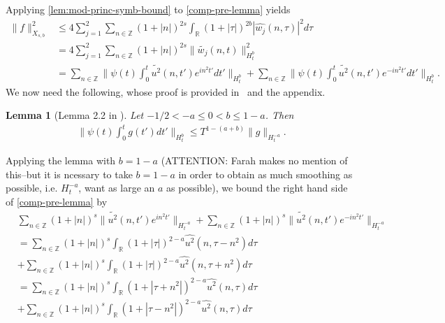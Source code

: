 \documentclass[12pt,reqno]{amsart}
\numberwithin{equation}{section}  %
\numberwithin{figure}{section}
\newcommand{\rr}{\mathbb{R}}
\newcommand{\zz}{\mathbb{Z}}
\newcommand{\wh}{\widehat}
\newcommand{\wt}{\widetilde}
\theoremstyle{plain}
\newtheorem{lemma}{Lemma}
\theoremstyle{definition}
\theoremstyle{remark}
\begin{document}
%
%
Applying \autoref{lem:mod-princ-symb-bound} to \eqref{comp-pre-lemma} yields
%
%
\begin{equation*}
\begin{split}
\| f \|_{X_{s,b}}^{2}
  & \le 4 \sum_{j=1}^{2}  \sum_{n \in \zz} (1 + |n|)^{2s} \int_{\rr} (1 + |
  \tau|)^{2b} | \wh{w_{j}}(n, \tau)|^2 d \tau
  \\
  & = 4 \sum_{j=1}^{2} \sum_{n \in \zz} (1 + |n|)^{2s} \|\wt{w_{j}}(n, t)
  \|^{2}_{H_{t}^{b}}
  \\
  & = \sum_{n \in \zz} \| \psi(t) \int_{0}^{t} \wt{u^2}(n, t')
  e^{in^{2}t'}dt'  \|_{H_{t}^{b}}
  + 
  \sum_{n \in \zz} \| \psi(t) \int_{0}^{t} \wt{u^2}(n, t')
  e^{-in^{2}t'}dt'  \|_{H_{t}^{b}}.
\end{split}
\end{equation*}
%
We now need the following, whose proof is provided in~\cite{Ginibre:1996fk} and
the appendix.
%
%
%
%
%
%
%
%
\begin{lemma}[Lemma 2.2 in \cite{Farah:2009uq}]
Let $-1/2 < -a \le 0 < b \le 1-a$. Then
%
%
\begin{equation*}
\begin{split}
  \| \psi(t) \int_{0}^{t} g(t') dt' \|_{H^{b}_{t}} \le T^{1-(a+b)} \| g
  \|_{H_{t}^{-a}}.
\end{split}
\end{equation*}
%
%
\label{lem:pre-bilin-est}
\end{lemma}
%
%
Applying the lemma with $b = 1 - a$ (ATTENTION: Farah makes no mention of this--but it is
ncessary to take $b = 1-a$ in order to obtain as much smoothing as possible,
i.e. $H_t^{-a}$, want as large an $a$ as possible), we bound the right hand side of \eqref{comp-pre-lemma} by
%
%
\begin{equation*}
\begin{split}
  & \sum_{n \in \zz} (1 + |n|)^{s} \| \wt{u^{2}}(n, t')
  e^{in^{2}t'} \|_{H_{t}^{-a}}  +
  \sum_{n \in \zz} (1 + |n|)^{s} \| \wt{u^{2}}(n, t')
  e^{-in^{2}t'} \|_{H_{t}^{-a}} 
  \\
  & = \sum_{n \in \zz} (1 + |n|)^{s} \int_{\rr} (1 + | \tau
  |)^{2-a} \wh{u^{2}}(n, \tau - n^{2}) d \tau 
  \\
  & +
  \sum_{n \in \zz} (1 + |n|)^{s} \int_{\rr} (1 + | \tau
  |)^{2-a} \wh{u^{2}}(n, \tau + n^{2}) d \tau 
  \\
  & = \sum_{n \in \zz} (1 + |n|)^{s} \int_{\rr} (1 + | \tau
  + n^{2}
  |)^{2-a} \wh{u^{2}}(n, \tau ) d \tau 
  \\
  & +
  \sum_{n \in \zz} (1 + |n|)^{s} \int_{\rr} (1 + | \tau
  - n^{2} |)^{2-a} \wh{u^{2}}(n, \tau) d \tau  
\end{split}
\end{equation*}
\end{document}
